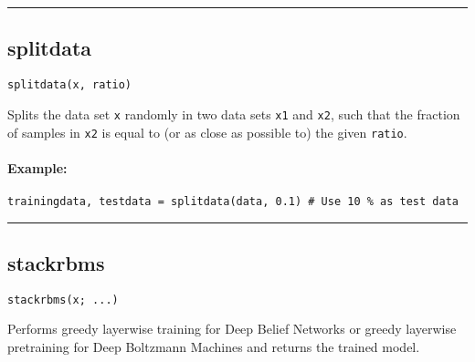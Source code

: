 \noindent\rule{\textwidth}{1pt}
\subsection*{splitdata}  \label{bms_splitdata}
\begin{verbatim}
splitdata(x, ratio)
\end{verbatim}
Splits the data set \texttt{x} randomly in two data sets \texttt{x1} and \texttt{x2}, such that the fraction of samples in \texttt{x2} is equal to (or as close as possible to) the given \texttt{ratio}.

\paragraph*{Example:}
\begin{verbatim}
trainingdata, testdata = splitdata(data, 0.1) # Use 10 % as test data
\end{verbatim}
\noindent\rule{\textwidth}{1pt}
\subsection*{stackrbms}  \label{bms_stackrbms}
\begin{verbatim}
stackrbms(x; ...)
\end{verbatim}
Performs greedy layerwise training for Deep Belief Networks or greedy layerwise pretraining for Deep Boltzmann Machines and returns the trained model.

